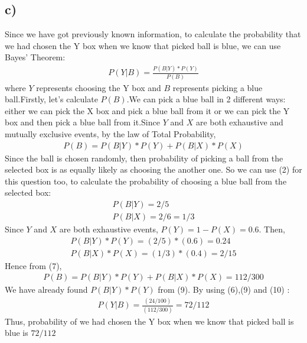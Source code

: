 \documentclass[12pt]{article}
\begin{document}
\subsection*{c)} Since we have got previously known information, to calculate the probability that we had chosen the Y box when we know that picked ball is blue, we can use Bayes' Theorem:
\begin{equation} 
\begin{split}
P(Y|B) = \frac{P(B|Y)*P(Y)}{P(B)}
\end{split}
\end{equation}
where $Y$ represents choosing the Y box and $B$ represents picking a blue ball.Firstly, let's calculate $P(B)$.We can pick a blue ball in 2 different ways: either we can pick the X box and pick a blue ball from it or we can pick the Y box and then pick a blue ball from it.Since $Y$ and $X$ are both exhaustive and mutually exclusive events, by the law of Total Probability,
\begin{equation} 
\begin{split}
P(B) = P(B|Y)*P(Y) + P(B|X)*P(X)
\end{split}
\end{equation}
Since the ball is chosen randomly, then probability of picking a ball from the selected box is as equally likely as choosing the another one. So we can use (2) for this question too, to calculate the probability of choosing a blue ball from the selected box:
\begin{equation} 
\begin{split}
P(B|Y) = 2/5 \\
P(B|X) = 2/6 = 1/3 
\end{split}
\end{equation}
Since $Y$ and $X$ are both exhaustive events, $P(Y) = 1-P(X) = 0.6$. Then,
\begin{equation} 
\begin{split}
P(B|Y)*P(Y) = (2/5)*(0.6)= 0.24 \\
P(B|X)*P(X) = (1/3)*(0.4) = 2/15 
\end{split}
\end{equation}
Hence from (7),
\begin{equation} 
\begin{split}
P(B) = P(B|Y)*P(Y) + P(B|X)*P(X) = 112/300
\end{split}
\end{equation}
We have already found $P(B|Y)*P(Y)$ from (9). By using (6),(9) and (10) :
\begin{equation} 
\begin{split}
P(Y|B) = \frac{(24/100)}{(112/300)} =72/112
\end{split}
\end{equation}
Thus, probability of we had chosen the Y box when we know that picked ball is blue is $72/112$
\end{document}
